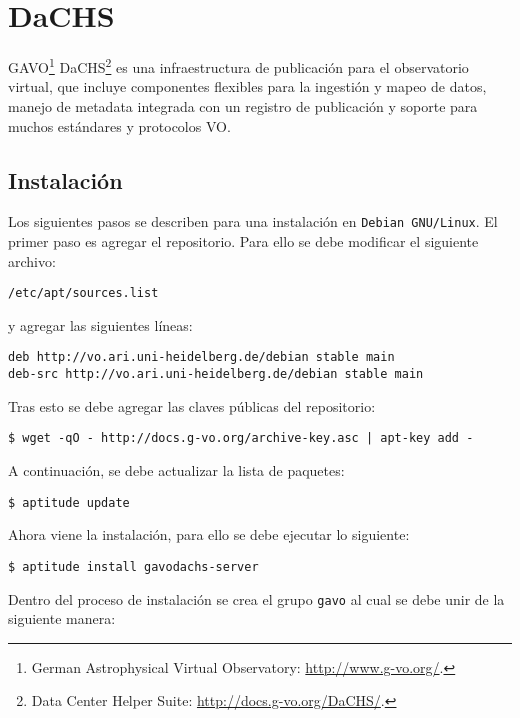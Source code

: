 \section{DaCHS}\label{anx:dachs}

GAVO\footnote{German Astrophysical Virtual Observatory: \url{http://www.g-vo.org/}.} DaCHS\footnote{Data Center Helper Suite: \url{http://docs.g-vo.org/DaCHS/}.} es una infraestructura de publicación para el observatorio virtual, que incluye componentes flexibles para la ingestión y mapeo de datos, manejo de metadata integrada con un registro de publicación y soporte para muchos estándares y protocolos VO.

\subsection*{Instalación}

Los siguientes pasos se describen para una instalación en \verb;Debian GNU/Linux;. El primer paso es agregar el repositorio. Para ello se debe modificar el siguiente archivo:

\begin{verbatim}
/etc/apt/sources.list
\end{verbatim}

y agregar las siguientes líneas:

\begin{verbatim}
deb http://vo.ari.uni-heidelberg.de/debian stable main
deb-src http://vo.ari.uni-heidelberg.de/debian stable main
\end{verbatim}

Tras esto se debe agregar las claves públicas del repositorio:

\begin{verbatim}
$ wget -qO - http://docs.g-vo.org/archive-key.asc | apt-key add -
\end{verbatim}

A continuación, se debe actualizar la lista de paquetes:

\begin{verbatim}
$ aptitude update
\end{verbatim}

Ahora viene la instalación, para ello se debe ejecutar lo siguiente:

\begin{verbatim}
$ aptitude install gavodachs-server
\end{verbatim}

Dentro del proceso de instalación se crea el grupo \verb;gavo; al cual se debe unir de la siguiente manera:

